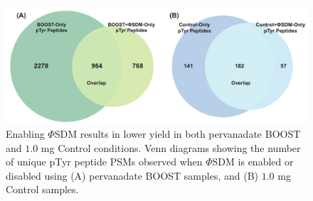 \documentclass[journal=jprobs,manuscript=article]{achemso}
\begin{document}

\clearpage

\begin{figure}[t!]
\centering
\includegraphics[width=165mm]{figures/supplements/set_overlap_2.pdf}
\caption{Enabling $\Phi$SDM results in lower yield in both pervanadate BOOST and $1.0$ mg Control conditions. Venn diagrams showing the number of unique pTyr peptide PSMs observed when $\Phi$SDM is enabled or disabled using (A) pervanadate BOOST samples, and (B) $1.0$ mg Control samples.}\label{set_overlap_2}
\end{figure}

\clearpage
\end{document}
